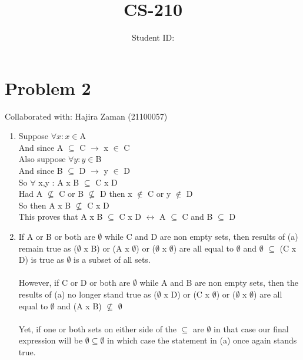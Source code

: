 \documentclass{article}
\title{CS-210 \hwNo}
\author{\myname \qquad Student ID: \myid}
\begin{document}
\maketitle

\section{Problem 2}
Collaborated with: Hajira Zaman (21100057)
\begin{enumerate}
\item %
Suppose $\forall x : x \in $A\\
And since A $\subseteq$ C $\rightarrow$ x $\in$ C \\
Also suppose $\forall y : y \in $B\\
And since B $\subseteq$ D $\rightarrow$ y $\in$ D \\
So $\forall$ x,y : A x B $\subseteq$ C x D \\
Had A $\nsubseteq$ C or B $\nsubseteq$ D then x $\notin$ C or y $\notin$ D \\
So then A x B $\nsubseteq$ C x D\\
This proves that A x B $\subseteq$ C x D $\leftrightarrow$ A $\subseteq$ C and B $\subseteq$ D\\

\item %
If A or B or both are $\emptyset$ while C and D are non empty sets, then results of (a) remain true as ($\emptyset$ x B) or (A x $\emptyset$) or ($\emptyset$ x $\emptyset$) are all equal to $\emptyset$ and $\emptyset$ $\subseteq$ (C x D) is true as $\emptyset$ is a subset of all sets.\\ \\
However, if C or D or both are $\emptyset$ while A and B are non empty sets, then the results of (a) no longer stand true as ($\emptyset$ x D) or (C x $\emptyset$) or ($\emptyset$ x $\emptyset$) are all equal to $\emptyset$ and (A x B) $\nsubseteq$ $\emptyset$ \\ \\
Yet, if one or both sets on either side of the $\subseteq$ are $\emptyset$ in that case our final expression will be $\emptyset \subseteq \emptyset$ in which case the statement in (a) once again stands true.

\end{enumerate}
\end{document}
